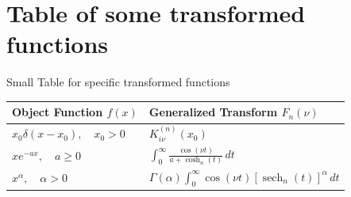 \documentclass{article}
\DeclareMathOperator{\sech}{sech}
\begin{document}
\section{Table of some transformed functions}
Small Table for specific transformed functions
\begin{table}[htbp]
\centering
\label{tab:kl_pairs}

\begin{tabularx}{\textwidth}{ >{\centering\arraybackslash}X >{\centering\arraybackslash}X }
\toprule
\textbf{Object Function } $f(x)$ & \textbf{Generalized Transform } $F_n(\nu)$ \\ 
\midrule
$x_0 \delta(x - x_0), \quad x_0 > 0$ & $K_{i\nu}^{(n)}(x_0)$ \\ 
\addlinespace
$x e^{-ax}, \quad a \ge 0$ & $\displaystyle\int_0^\infty \frac{\cos(\nu t)}{a + \cosh_n(t)} \, dt$ \\ 
\addlinespace
$x^\alpha, \quad \alpha > 0$ & $\displaystyle\Gamma(\alpha) \int_0^\infty \cos(\nu t) \left[\sech_n(t)\right]^\alpha \, dt$ \\ 
\bottomrule
\end{tabularx}
\end{table}


\end{document}
